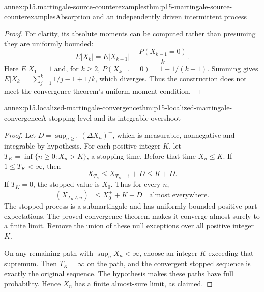 \begin{annexitem}{annex:p15.martingale-source-counterexamples}{thm:p15-martingale-source-counterexamples}{Absorption and an independently driven intermittent process}
\begin{proof}
For clarity, its absolute moments can be computed rather than
presuming they are uniformly bounded:
\[
                 E|X_k|=E|X_{k-1}|+\frac{P(X_{k-1}=0)}k.
\]
Here \(E|X_1|=1\) and, for \(k\geq2\),
\(P(X_{k-1}=0)=1-1/(k-1)\).
Summing gives
\(E|X_k|=\sum_{j=1}^k1/j-1+1/k\), which diverges.
Thus the construction does not meet the convergence theorem's
uniform moment condition.
\end{proof}
\end{annexitem}

\begin{annexitem}{annex:p15.localized-martingale-convergence}{thm:p15-localized-martingale-convergence}{A stopping level and its integrable overshoot}
\begin{proof}
Let \(D=\sup_{n\geq1}(\Delta X_n)^+\), which is measurable,
nonnegative and integrable by hypothesis.
For each positive integer \(K\), let
\(T_K=\inf\{n\geq0:X_n>K\}\), a stopping time.
Before that time \(X_n\leq K\).
If \(1\leq T_K<\infty\), then
\[
                    X_{T_K}\leq X_{T_K-1}+D\leq K+D.
\]
If \(T_K=0\), the stopped value is \(X_0\).
Thus for every \(n\),
\[
                    (X_{T_K\wedge n})^+\leq X_0^++K+D
                                           \quad\text{almost everywhere}.
\]
The stopped process is a submartingale and has uniformly bounded
positive-part expectations. The proved convergence theorem makes
it converge almost surely to a finite limit.
Remove the union of these null exceptions over all positive integer \(K\).

On any remaining path with \(\sup_nX_n<\infty\), choose an integer
\(K\) exceeding that supremum. Then \(T_K=\infty\) on the path,
and the convergent stopped sequence is exactly the original sequence.
The hypothesis makes these paths have full probability.
Hence \(X_n\) has a finite almost-sure limit, as claimed.
\end{proof}
\end{annexitem}

